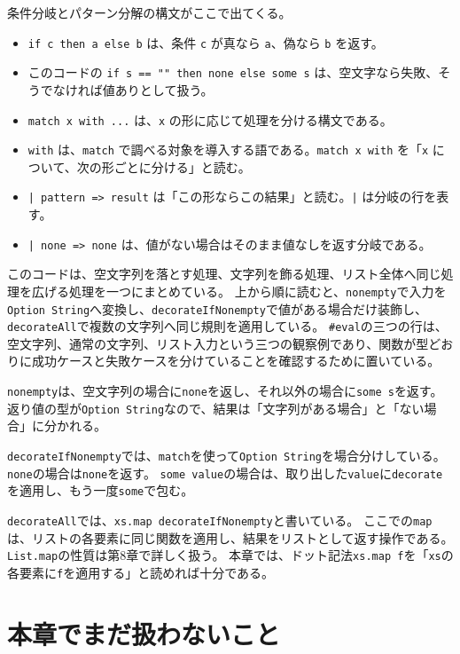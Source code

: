 \begin{syntaxbox}
条件分岐とパターン分解の構文がここで出てくる。
\begin{itemize}
\item \texttt{if c then a else b} は、条件 \texttt{c} が真なら \texttt{a}、偽なら \texttt{b} を返す。
\item このコードの \texttt{if s == "" then none else some s} は、空文字なら失敗、そうでなければ値ありとして扱う。
\item \texttt{match x with ...} は、\texttt{x} の形に応じて処理を分ける構文である。
\item \texttt{with} は、\texttt{match} で調べる対象を導入する語である。\texttt{match x with} を「\texttt{x} について、次の形ごとに分ける」と読む。
\item \texttt{| pattern => result} は「この形ならこの結果」と読む。\texttt{|} は分岐の行を表す。
\item \texttt{| none => none} は、値がない場合はそのまま値なしを返す分岐である。
\end{itemize}
\end{syntaxbox}


このコードは、空文字列を落とす処理、文字列を飾る処理、リスト全体へ同じ処理を広げる処理を一つにまとめている。
上から順に読むと、\texttt{nonempty}で入力を\texttt{Option String}へ変換し、\texttt{decorateIfNonempty}で値がある場合だけ装飾し、\texttt{decorateAll}で複数の文字列へ同じ規則を適用している。
\texttt{\#eval}の三つの行は、空文字列、通常の文字列、リスト入力という三つの観察例であり、関数が型どおりに成功ケースと失敗ケースを分けていることを確認するために置いている。

\texttt{nonempty}は、空文字列の場合に\texttt{none}を返し、それ以外の場合に\texttt{some s}を返す。
返り値の型が\texttt{Option String}なので、結果は「文字列がある場合」と「ない場合」に分かれる。

\texttt{decorateIfNonempty}では、\texttt{match}を使って\texttt{Option String}を場合分けしている。
\texttt{none}の場合は\texttt{none}を返す。
\texttt{some value}の場合は、取り出した\texttt{value}に\texttt{decorate}を適用し、もう一度\texttt{some}で包む。

\texttt{decorateAll}では、\texttt{xs.map decorateIfNonempty}と書いている。
ここでの\texttt{map}は、リストの各要素に同じ関数を適用し、結果をリストとして返す操作である。
\texttt{List.map}の性質は第8章で詳しく扱う。
本章では、ドット記法\texttt{xs.map f}を「\texttt{xs}の各要素に\texttt{f}を適用する」と読めれば十分である。

\section{本章でまだ扱わないこと}

